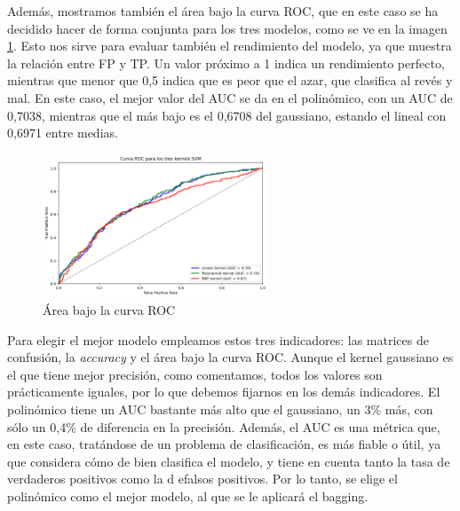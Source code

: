 \documentclass[a4paper,onecolumn]{extarticle}
\begin{document}
\begin{sloppypar}
Además, mostramos también el área bajo la curva ROC, que en este caso se ha decidido hacer de forma conjunta para los tres modelos, como se ve en la imagen 
\ref{fig:AUC}. Esto nos sirve para evaluar también el rendimiento del modelo, ya que muestra la relación entre FP y TP. Un valor próximo a 1 indica un rendimiento 
perfecto, mientras que menor que 0,5 indica que es peor que el azar, que clasifica al revés y mal. En este caso, el mejor valor del AUC se da en el polinómico, 
con un AUC de 0,7038, mientras que el más bajo es el 0,6708 del gaussiano, estando el lineal con 0,6971 entre medias.
\begin{figure}[h]
    \centering
    \includegraphics[width=0.6\textwidth]{imgs/curvaROC.png}
    \caption{Área bajo la curva ROC} \label{fig:AUC}
\end{figure}

Para elegir el mejor modelo empleamos estos tres indicadores: las matrices de confusión, la \textit{accuracy} y el área bajo la curva ROC. Aunque el kernel
gaussiano es el que tiene mejor precisión, como comentamos, todos los valores son prácticamente iguales, por lo que debemos fijarnos en los demás indicadores. 
El polinómico tiene un AUC bastante más alto que el gaussiano, un 3\% más, con sólo un 0,4\% de diferencia en la precisión. Además, el AUC es una métrica que, 
en este caso, tratándose de un problema de clasificación, es más fiable o útil, ya que considera cómo de bien clasifica el modelo, y tiene en cuenta tanto la 
tasa de verdaderos positivos como la d efalsos positivos. Por lo tanto, se elige el polinómico como el mejor modelo, al que se le aplicará el bagging.


\end{sloppypar}
\end{document}
